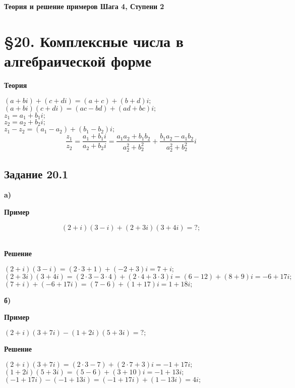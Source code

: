 \documentclass[12pt]{article}
\begin{document}
\begin{titlepage}
\begin{center}
\textbf{\huge Теория  и решение примеров Шага 4, Ступени 2}
\end{center}
\end{titlepage}
\tableofcontents
\newpage
\section{\S 20. Комплексные числа в алгебраической форме}
\begin{center}\textbf{Теория}\end{center}
$ (a+bi) + (c+di) = (a+c)+(b+d)i; $ \\
$ (a+bi)(c+di) = (ac-bd)+(ad+bc)i; $\\
$ z_1 = a_1+b_1i;$\\
$ z_2 = a_2+b_2i;$\\
$ z_1 - z_2 = (a_1-a_2)+(b_1-b_2)i; $\\
$$ 
\frac{z_1}{z_2}=
\frac{a_1+b_1i}{a_2+b_2i}=
\frac{a_1 a_2 + b_1 b_2}{a_2^2+b_2^2}+
\frac{b_1 a_2 - a_1 b_2}{a_2^2+b_2^2}i
$$
\subsection{Задание 20.1}

\textbf{a)}\\
\begin{center}\textbf{Пример}\end{center}
$$(2+i)(3-i)+(2+3i)(3+4i) = ?;$$\\
\begin{center}\textbf{Решение}\end{center}
$(2+i)(3-i)=(2\cdot3+1)+(-2+3)i = 7+i;$\\
$(2+3i)(3+4i) =(2\cdot3-3\cdot4)+( 2\cdot 4+3\cdot3)i=(6-12)+(8+9)i=-6+17i;$\\
$(7+i)+(-6+17i)=(7-6)+(1+17)i=1+18i;$

\newpage
\textbf{б)}\\
\begin{center}\textbf{Пример}\end{center}
$(2+i)(3+7i)-(1+2i)(5+3i) = ?;$
\begin{center}\textbf{Решение}\end{center}
$(2+i)(3+7i) = (2\cdot3-7)+(2\cdot7+3)i=-1+17i;$\\
$(1+2i)(5+3i) =(5-6)+(3+10)i = -1+13i;$\\
$(-1+17i)-(-1+13i)=(-1+17i)+(1-13i)=4i;$
\end{document}
